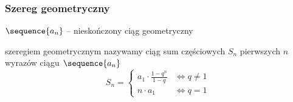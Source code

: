 \subsubsection*{Szereg geometryczny}
\begin{description}
    \item \(\sequence{a_n}\) -- nieskończony ciąg geometryczny
    \item szeregiem geometrycznym nazywamy ciąg sum częściowych \(S_n\) pierwszych \(n\) wyrazów ciągu \(\sequence{a_n}\)
        \begin{equation*}
            S_n = \begin{cases}
                a_1\cdot\frac{1-q^n}{1-q} & \iff q \neq 1\\
                n\cdot a_1 & \iff q = 1
            \end{cases}
        \end{equation*}
\end{description}
